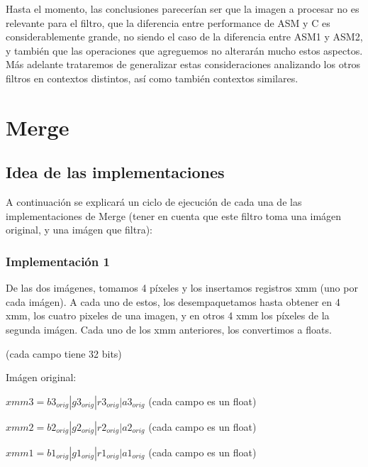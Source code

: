 \documentclass[a4paper]{article}
\begin{document}
Hasta el momento, las conclusiones parecerían ser que la imagen a procesar no es relevante para el filtro, que la diferencia entre performance de ASM y C es considerablemente grande, no siendo el caso de la diferencia entre ASM1 y ASM2, y también que las operaciones que agreguemos no alterarán mucho estos aspectos. Más adelante trataremos de generalizar estas consideraciones analizando los otros filtros en contextos distintos, así como también contextos similares.


\newpage
\section{Merge}

\subsection{Idea de las implementaciones}
A continuación se explicará un ciclo de ejecución de cada una de las implementaciones de Merge (tener en cuenta que este filtro toma una imágen original, y una imágen que filtra):

\subsubsection{Implementación 1}
De las dos imágenes, tomamos 4 píxeles y los insertamos registros xmm (uno por cada imágen). A cada uno de estos, los desempaquetamos hasta obtener en 4 xmm, los cuatro pixeles de una imagen, y en otros 4 xmm los píxeles de la segunda imágen. Cada uno de los xmm anteriores, los convertimos a floats.
\vspace*{0.3cm}

(cada campo tiene 32 bits)

Imágen original:

\vspace*{0.3cm}

$xmm3 = b3_{orig} | g3_{orig} | r3_{orig} | a3_{orig}$   (cada campo es un float)

\vspace*{0.3cm}

$xmm2 = b2_{orig} | g2_{orig} | r2_{orig} | a2_{orig}$   (cada campo es un float)

\vspace*{0.3cm}

$xmm1 = b1_{orig} | g1_{orig} | r1_{orig} | a1_{orig}$   (cada campo es un float)

\vspace*{0.3cm}
\end{document}
